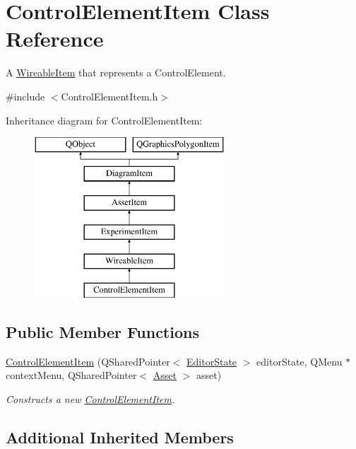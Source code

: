 \hypertarget{class_control_element_item}{\section{Control\-Element\-Item Class Reference}
\label{class_control_element_item}
}


A \hyperlink{class_wireable_item}{Wireable\-Item} that represents a Control\-Element.  




{\ttfamily \#include $<$Control\-Element\-Item.\-h$>$}

Inheritance diagram for Control\-Element\-Item\-:\begin{figure}[H]
\begin{center}
\leavevmode
\includegraphics[height=6.000000cm]{class_control_element_item}
\end{center}
\end{figure}
\subsection*{Public Member Functions}
\begin{DoxyCompactItemize}
\item 
\hyperlink{class_control_element_item_a647944d651332fb05b3866ddb013ea53}{Control\-Element\-Item} (Q\-Shared\-Pointer$<$ \hyperlink{class_editor_state}{Editor\-State} $>$ editor\-State, Q\-Menu $\ast$context\-Menu, Q\-Shared\-Pointer$<$ \hyperlink{class_picto_1_1_asset}{Asset} $>$ asset)
\begin{DoxyCompactList}\small\item\em Constructs a new \hyperlink{class_control_element_item}{Control\-Element\-Item}. \end{DoxyCompactList}\end{DoxyCompactItemize}
\subsection*{Additional Inherited Members}


